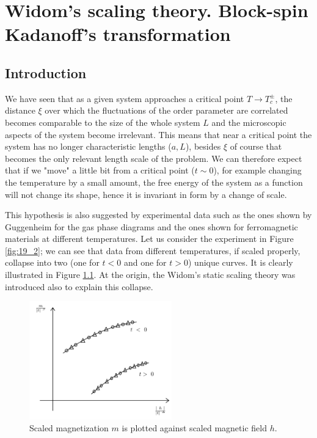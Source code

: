 \documentclass[../main/main.tex]{subfiles}
\begin{document}
\chapter{Widom's scaling theory. Block-spin Kadanoff's transformation}


\section{Introduction}
We have seen  that as a given system approaches a critical point \( T \rightarrow T_c^{\pm} \), the distance \( \xi  \)  over which the fluctuations of the order parameter are correlated becomes comparable to the size of the whole system \( L \) and the microscopic aspects of the system become irrelevant. This means that near a critical point the system has no longer characteristic lengths (\( a,L \)), besides \( \xi  \) of course that becomes the only relevant length scale of the problem. We can therefore expect that if we "move" a little bit from a critical point (\( t \sim 0 \)), for example changing the temperature by a small amount, the free energy of the system as a function will not change its shape, hence it is invariant in form by a change of scale.

 This hypothesis is also suggested by experimental data such as the ones shown by Guggenheim for the gas phase diagrams and the ones shown for ferromagnetic materials at different temperatures. Let us consider the experiment in Figure \ref{fig:19_2}; we can see that data from different temperatures, if scaled properly, collapse into two (one for \( t<0 \) and one for \( t>0 \)) unique curves. It is clearly illustrated in Figure \ref{fig:19_1}. At the origin, the Widom's static scaling theory was introduced also to explain this collapse.

 \begin{figure}[h!]
 \centering
 \includegraphics[width=0.55\textwidth]{../lessons/19_image/1.pdf}
 \caption{\label{fig:19_1} Scaled magnetization \( m \) is plotted against scaled magnetic field \( h \).}
 \end{figure}
\end{document}
